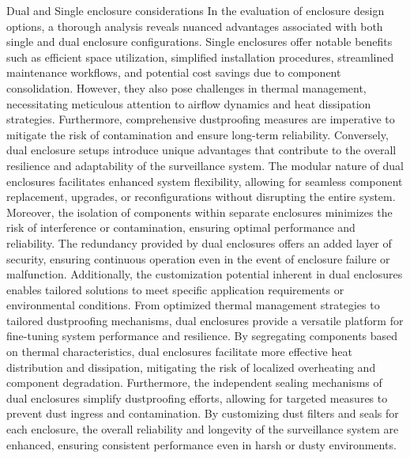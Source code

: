 \documentclass[class=report,11pt,crop=false]{standalone}
\begin{document}

Dual and Single enclosure considerations
In the evaluation of enclosure design options, a thorough analysis reveals nuanced advantages associated with both single and dual enclosure configurations. Single enclosures offer notable benefits such as efficient space utilization, simplified installation procedures, streamlined maintenance workflows, and potential cost savings due to component consolidation. However, they also pose challenges in thermal management, necessitating meticulous attention to airflow dynamics and heat dissipation strategies. Furthermore, comprehensive dustproofing measures are imperative to mitigate the risk of contamination and ensure long-term reliability.
Conversely, dual enclosure setups introduce unique advantages that contribute to the overall resilience and adaptability of the surveillance system. The modular nature of dual enclosures facilitates enhanced system flexibility, allowing for seamless component replacement, upgrades, or reconfigurations without disrupting the entire system. Moreover, the isolation of components within separate enclosures minimizes the risk of interference or contamination, ensuring optimal performance and reliability. The redundancy provided by dual enclosures offers an added layer of security, ensuring continuous operation even in the event of enclosure failure or malfunction.
Additionally, the customization potential inherent in dual enclosures enables tailored solutions to meet specific application requirements or environmental conditions. From optimized thermal management strategies to tailored dustproofing mechanisms, dual enclosures provide a versatile platform for fine-tuning system performance and resilience. By segregating components based on thermal characteristics, dual enclosures facilitate more effective heat distribution and dissipation, mitigating the risk of localized overheating and component degradation.
Furthermore, the independent sealing mechanisms of dual enclosures simplify dustproofing efforts, allowing for targeted measures to prevent dust ingress and contamination. By customizing dust filters and seals for each enclosure, the overall reliability and longevity of the surveillance system are enhanced, ensuring consistent performance even in harsh or dusty environments.
\end{document}
